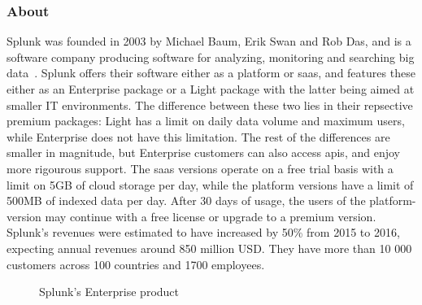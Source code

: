 {\subsubsection{About}
Splunk was founded in 2003 by Michael Baum, Erik Swan and Rob Das, and is a software company producing software for analyzing, monitoring and searching big data~\cite{derrickharris2010}. Splunk offers their software either as a platform or \gls{saas}, and features these either as an Enterprise package or a Light package with the latter being aimed at smaller IT environments. The difference between these two lies in their repsective premium packages: Light has a limit on daily data volume and maximum users, while Enterprise does not have this limitation. The rest of the differences are smaller in magnitude, but Enterprise customers can also access \glspl{api}, and enjoy more rigourous support. The \gls{saas} versions operate on a free trial basis with a limit on 5GB of cloud storage per day, while the platform versions have a limit of 500MB of indexed data per day. After 30 days of usage, the users of the platform-version may continue with a free license or upgrade to a premium version. Splunk's revenues were estimated to have increased by 50\% from 2015 to 2016, expecting annual revenues around 850 million USD. They have more than 10 000 customers across 100 countries and 1700 employees.

\begin{figure}[H]
    \centering
    \caption{Splunk's Enterprise product~\cite{splunkinc20162}}
    \label{fig:splunk}
\end{figure}

}
